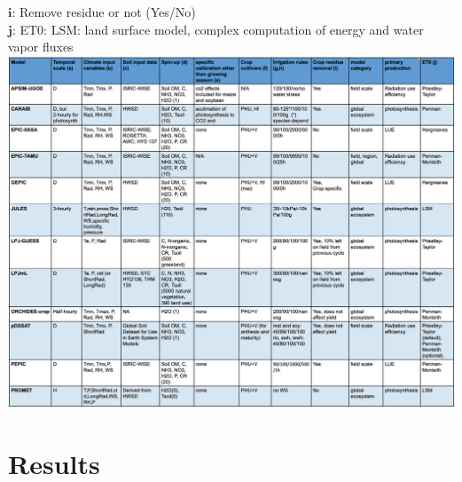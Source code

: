\documentclass[10pt]{article}
\begin{document}
\begin{table}[h!]
{        $\textbf{i:}$ Remove residue or not (Yes/No)\\
        $\textbf{j:}$ ET0: LSM: land surface model, complex computation of energy and water vapor fluxes\\
    }
    \vspace{-5mm}
    \includegraphics[width=\textwidth]{model_table.png}
    \label{fig:models}
\end{table}

\clearpage
\section{Results}
\end{document}
